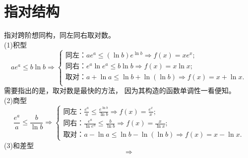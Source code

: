 \documentclass[UTF8,a4paper]{ctexart}
\begin{document}
\section{指对结构}
指对跨阶想同构，同左同右取对数。\\
(1)积型\begin{equation}
    ae^a\leq b\ln b\Rightarrow \begin{cases}
        \text{同左：} ae^a\leq (\ln b)e^{\ln b}
        \Rightarrow f(x)=xe^x;    \\
        \text{同右：} e^a\ln e^a\leq b\ln b\Rightarrow
        f(x)=x\ln x;              \\
        \text{取对：} a+\ln a\leq\ln b+\ln(\ln b)
        \Rightarrow f(x)=x+\ln x. \\
    \end{cases}
\end{equation}
需要指出的是，取对数是最快的方法，
因为其构造的函数单调性一看便知。\\
(2)商型\begin{equation}
    \frac{e^a}{a}\leq\frac{b}{\ln b}\Rightarrow\begin{cases}
        \text{同左：} \frac{e^a}{a}\leq\frac{e^{\ln b}}{\ln b}
        \Rightarrow f(x)=\frac{e^x}{x};   \\
        \text{同右：} \frac{e^a}{\ln e^a}\leq\frac{b}{\ln b}
        \Rightarrow f(x)=\frac{x}{\ln x}; \\
        \text{取对：}a-\ln a\leq \ln b-\ln(\ln b)\Rightarrow
        f(x)=x-\ln x.
    \end{cases}
\end{equation}
(3)和差型\begin{equation}
    \Longrightarrow
\end{equation}
\end{document}
